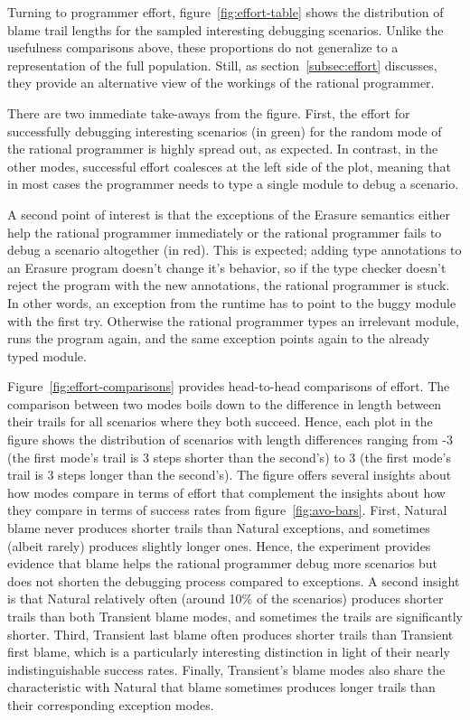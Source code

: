 Turning to programmer effort, figure~\ref{fig:effort-table} shows the
distribution of blame trail lengths for the sampled interesting debugging
scenarios. Unlike the usefulness comparisons above, these proportions do
not generalize to a representation of the full population.  Still, as
section~\ref{subsec:effort} discusses, they provide an alternative view of
the workings of the rational programmer. 

There are two immediate take-aways from the figure. First, the effort for
successfully debugging interesting scenarios (in green) for the random
mode of the rational programmer is highly spread out, as
expected. In contrast, in the other modes, successful effort coalesces at
the left side of the plot, meaning that in most cases the programmer needs
to type a single module to debug a scenario. 

A second point of interest is that the exceptions of the Erasure semantics
either help the rational programmer immediately or the rational programmer
fails to debug a scenario altogether (in red).  This is expected; adding
type annotations to an Erasure program doesn't change it's behavior, so if
the type checker doesn't reject the program with the new annotations, the
rational programmer is stuck.  In other words, an exception from the
runtime has to point to the buggy module with the first try. Otherwise the
rational programmer types an irrelevant module, runs the program again,
and the same exception points again to the already typed module. 

Figure~\ref{fig:effort-comparisons} provides head-to-head comparisons of
effort.  The comparison between two modes boils down to the difference in
length between their trails for all scenarios where they both succeed.
Hence, each plot in the figure shows the distribution of scenarios with
length differences ranging from -3 (the first mode's trail is 3 steps
shorter than the second's) to 3 (the first mode's trail is 3 steps longer
than the second's).  The figure offers several insights about how  modes
compare in terms of effort that complement the insights about how they
compare in terms of success rates from figure~\ref{fig:avo-bars}.  First,
Natural blame never produces shorter trails than Natural exceptions, and
sometimes (albeit rarely) produces slightly longer ones.  Hence, the
experiment provides evidence that blame helps the rational programmer
debug more scenarios but does not shorten the debugging process compared
to exceptions. A second insight is that Natural relatively often (around 10\% of the
scenarios) produces shorter trails than both Transient blame modes, and
sometimes the trails are significantly shorter.  Third, Transient last
blame often produces shorter trails than Transient first blame, which is a
particularly interesting distinction in light of their nearly
indistinguishable success rates.  Finally, Transient's blame modes also
share the characteristic with Natural that blame sometimes produces longer
trails than their corresponding exception modes.

